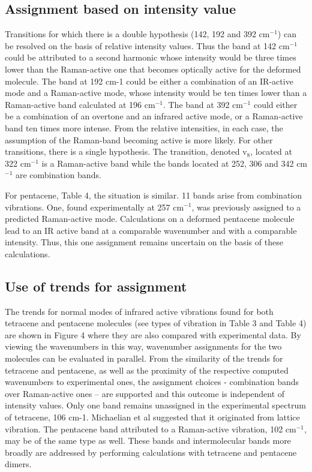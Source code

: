 \subsection*{Assignment based on intensity value}

Transitions for which there is a double hypothesis (142, 192 and 392 cm$^{-1}$) can be resolved on the basis of relative intensity values. Thus the band at 142 cm$^{-1}$ could be attributed to a second harmonic whose intensity would be three times lower than the Raman-active one that becomes optically active for the deformed molecule. The band at 192 cm-1 could be either a combination of an IR-active mode and a Raman-active mode, whose intensity would be ten times lower than a Raman-active band calculated at 196 cm$^{-1}$. The band at 392 cm$^{-1}$ could either be a combination of an overtone and an infrared active mode, or a Raman-active band ten times more intense. From the relative intensities, in each case, the assumption of the Raman-band becoming active is more likely. For other transitions, there is a single hypothesis. The transition, denoted v$_{8}$, located at 322 cm$^{-1}$ is a Raman-active band while the bands located at 252, 306 and 342 cm$^{-1}$ are combination bands. 

For pentacene, Table 4, the situation is similar. 11 bands arise from combination vibrations. One, found experimentally at 257 cm$^{-1}$, was previously assigned to a predicted Raman-active mode. Calculations on a deformed pentacene molecule lead to an IR active band at a comparable wavenumber and with a comparable intensity. Thus, this one assignment remains uncertain on the basis of these calculations. 

\subsection*{Use of trends for assignment}

The trends for normal modes of infrared active vibrations found for both tetracene and pentacene molecules (see types of vibration in Table 3 and Table 4) are shown in Figure 4 where they are also compared with experimental data. By viewing the wavenumbers in this way, wavenumber assignments for the two molecules can be evaluated in parallel. From the similarity of the trends for tetracene and pentacene, as well as the proximity of the respective computed wavenumbers to experimental ones, the assignment choices - combination bands over Raman-active ones – are supported and this outcome is independent of intensity values. Only one band remains unassigned in the experimental spectrum of tetracene, 106 cm-1. Michaelian et al \cite{michaelian2012far} suggested that it originated from lattice vibration. The pentacene band attributed to a Raman-active vibration, 102 cm$^{-1}$, may be of the same type as well.  These bands and intermolecular bands more broadly are addressed by performing calculations with tetracene and pentacene dimers. 

